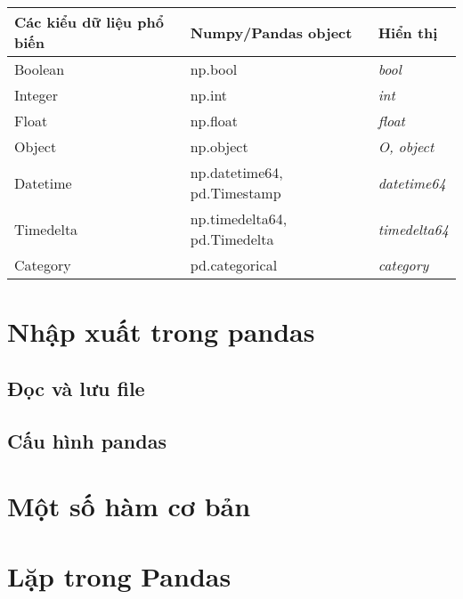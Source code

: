 \documentclass[
]{book}
\begin{document}
\begin{longtable}[]{@{}
  >{\raggedright\arraybackslash}p{}
  >{\raggedright\arraybackslash}p{}
  >{\raggedright\arraybackslash}p{}@{}}
\toprule
Các kiểu dữ liệu
phổ biến & Numpy/Pandas
object & Hiển thị \\
\midrule
\endhead
Boolean & np.bool & \emph{bool} \\
Integer & np.int & \emph{int} \\
Float & np.float & \emph{float} \\
Object & np.object & \emph{O, object} \\
Datetime & np.datetime64,
pd.Timestamp & \emph{datetime64} \\
Timedelta & np.timedelta64,
pd.Timedelta & \emph{timedelta64} \\
Category & pd.categorical & \emph{category} \\
\bottomrule
\end{longtable}

\hypertarget{nhux1eadp-xuux1ea5t-trong-pandas}{%
\chapter{Nhập xuất trong pandas}\label{nhux1eadp-xuux1ea5t-trong-pandas}}

\hypertarget{ux111ux1ecdc-vuxe0-lux1b0u-file}{%
\section{Đọc và lưu file}\label{ux111ux1ecdc-vuxe0-lux1b0u-file}}

\hypertarget{cux1ea5u-huxecnh-pandas}{%
\section{Cấu hình pandas}\label{cux1ea5u-huxecnh-pandas}}

\hypertarget{mux1ed9t-sux1ed1-huxe0m-cux1a1-bux1ea3n}{%
\chapter{Một số hàm cơ bản}\label{mux1ed9t-sux1ed1-huxe0m-cux1a1-bux1ea3n}}

\hypertarget{lux1eb7p-trong-pandas}{%
\chapter{Lặp trong Pandas}\label{lux1eb7p-trong-pandas}}
\end{document}
